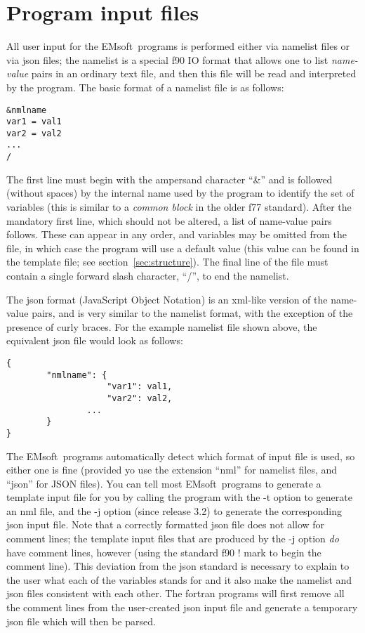 \documentclass[DIV=calc, paper=letter, fontsize=11pt]{scrartcl}	 %
\newcommand{\ctp}{\textsf{EMsoft}}
\begin{document}
\newpage
\section{Program input files\label{sec:f90input}}
All user input for the \ctp\ programs is performed either via namelist files or via json files; the namelist is a special f90 IO format that allows one to list 
\textit{name-value} pairs in an ordinary text file, and then this file will be read and interpreted by the 
program.  The basic format of a namelist file is as follows:
\begin{verbatim}
&nmlname
var1 = val1
var2 = val2
...
/
\end{verbatim}
The first line must begin with the ampersand character ``\&'' and is followed (without spaces) by the internal name used by the program 
to identify the set of variables (this is similar to a \textit{common block} in the older f77 standard).  After the mandatory first line, which should not be altered, a 
list of name-value pairs follows.  These can appear in any order, and variables may be omitted from the file, in which case the program
will use a default value (this value can be found in the template file; see section~\ref{sec:structure}).  The final line of the file must contain a single forward slash
character, ``/'', to end the namelist.

The json format (JavaScript Object Notation) is an xml-like version of the name-value pairs, and is very similar to the namelist format, with the exception 
of the presence of curly braces.  For the example namelist file shown above, the equivalent json file would look as follows:
\begin{verbatim}
{
        "nmlname": {
        	        "var1": val1,
        	        "var2": val2,
                ...		
        }
}
\end{verbatim}
The \ctp\ programs automatically detect which format of input file is used, so either one is fine (provided yo use the extension ``nml'' for namelist files,
and ``json'' for JSON files).  You can tell most \ctp\ programs to
generate a template input file for you by calling the program with the -t option to generate an nml file, and the -j option (since release 3.2)
to generate the corresponding json input file.  Note that a correctly formatted json file does not allow for comment lines; the template input files 
that are produced by the -j option \textit{do} have comment lines, however (using the standard f90 ! mark to begin the comment line).  This 
deviation from the json standard is necessary to explain to the user what each of the variables stands for and it also make the namelist and json
files consistent with each other.  The fortran programs will first remove all the comment lines from the user-created json input file and generate 
a temporary json file which will then be parsed.  \\
\end{document}
